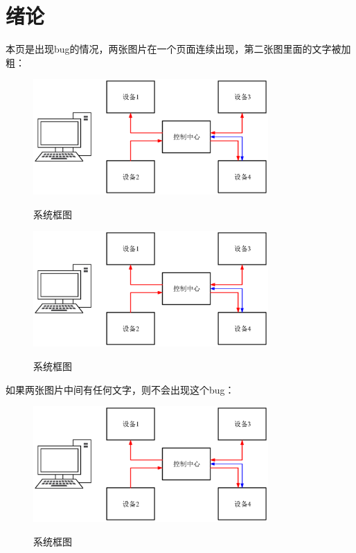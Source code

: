 \chapter{绪论}

本页是出现bug的情况，两张图片在一个页面连续出现，第二张图里面的文字被加粗：

\begin{figure}[htbp]
	\centering
	\includegraphics[width=0.8\textwidth]{VisioDrawing.eps}\\
	\caption{系统框图}\label{fig:system1}
\end{figure}


\begin{figure}[htbp]
	\centering
	\includegraphics[width=0.8\textwidth]{VisioDrawing.eps}\\
	\caption{系统框图}\label{fig:system2}
\end{figure}

\newpage

如果两张图片中间有任何文字，则不会出现这个bug：

\begin{figure}[htbp]
	\centering
	\includegraphics[width=0.8\textwidth]{VisioDrawing.eps}\\
	\caption{系统框图}\label{fig:system3}
\end{figure}

